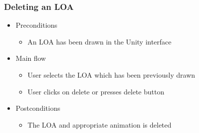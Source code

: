 \subsubsection{Deleting an LOA}
    \begin{itemize}
    \item Preconditions
        \begin{itemize}
            \item An LOA has been drawn in the Unity interface
        \end{itemize}
    \end{itemize}
    \begin{itemize}
        \item Main flow
        \begin{itemize}
            \item User selects the LOA which has been previously drawn
            \item User clicks on delete or presses delete button
        \end{itemize}
    \end{itemize}
    \begin{itemize}
        \item Postconditions
        \begin{itemize}
            \item The LOA and appropriate animation is deleted
        \end{itemize}
    \end{itemize}

